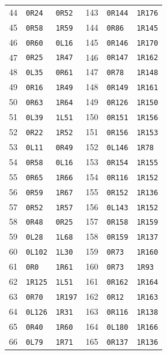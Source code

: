\begin{longtable}{@{}r ll @{\qquad} r ll@{}}
44 & \texttt{0R24} & \texttt{0R52} & 143 & \texttt{0R144} & \texttt{1R176} \\
45 & \texttt{0R58} & \texttt{1R59} & 144 & \texttt{0R86} & \texttt{1R145} \\
46 & \texttt{0R60} & \texttt{0L16} & 145 & \texttt{0R146} & \texttt{1R170} \\
47 & \texttt{0R25} & \texttt{1R47} & 146 & \texttt{0R147} & \texttt{1R162} \\
48 & \texttt{0L35} & \texttt{0R61} & 147 & \texttt{0R78} & \texttt{1R148} \\
49 & \texttt{0R16} & \texttt{1R49} & 148 & \texttt{0R149} & \texttt{1R161} \\
50 & \texttt{0R63} & \texttt{1R64} & 149 & \texttt{0R126} & \texttt{1R150} \\
51 & \texttt{0L39} & \texttt{1L51} & 150 & \texttt{0R151} & \texttt{1R156} \\
52 & \texttt{0R22} & \texttt{1R52} & 151 & \texttt{0R156} & \texttt{1R153} \\
53 & \texttt{0L11} & \texttt{0R49} & 152 & \texttt{0L146} & \texttt{1R78} \\
54 & \texttt{0R58} & \texttt{0L16} & 153 & \texttt{0R154} & \texttt{1R155} \\
55 & \texttt{0R65} & \texttt{1R66} & 154 & \texttt{0R116} & \texttt{1R152} \\
56 & \texttt{0R59} & \texttt{1R67} & 155 & \texttt{0R152} & \texttt{1R136} \\
57 & \texttt{0R52} & \texttt{1R57} & 156 & \texttt{0L143} & \texttt{1R152} \\
58 & \texttt{0R48} & \texttt{0R25} & 157 & \texttt{0R158} & \texttt{1R159} \\
59 & \texttt{0L28} & \texttt{1L68} & 158 & \texttt{0R159} & \texttt{1R137} \\
60 & \texttt{0L102} & \texttt{1L30} & 159 & \texttt{0R73} & \texttt{1R160} \\
61 & \texttt{0R0} & \texttt{1R61} & 160 & \texttt{0R73} & \texttt{1R93} \\
62 & \texttt{1R125} & \texttt{1L51} & 161 & \texttt{0R162} & \texttt{1R164} \\
63 & \texttt{0R70} & \texttt{1R197} & 162 & \texttt{0R12} & \texttt{1R163} \\
64 & \texttt{0L126} & \texttt{1R31} & 163 & \texttt{0R116} & \texttt{1R138} \\
65 & \texttt{0R40} & \texttt{1R60} & 164 & \texttt{0L180} & \texttt{1R166} \\
66 & \texttt{0L79} & \texttt{1R71} & 165 & \texttt{0R137} & \texttt{1R136} \\

\end{longtable}
